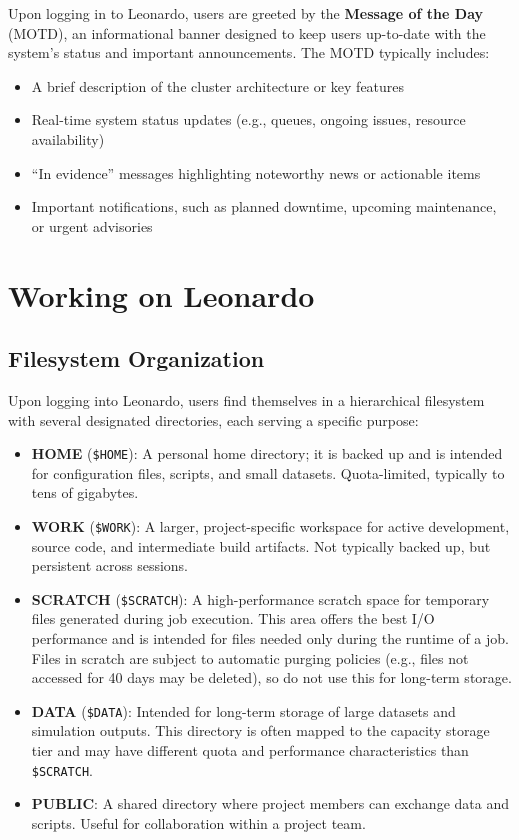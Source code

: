 Upon logging in to Leonardo, users are greeted by the \textbf{Message of the Day} (MOTD), an informational banner designed to keep users up-to-date with the system's status and important announcements. The MOTD typically includes:
\begin{itemize}
    \item A brief description of the cluster architecture or key features
    \item Real-time system status updates (e.g., queues, ongoing issues, resource availability)
    \item ``In evidence'' messages highlighting noteworthy news or actionable items
    \item Important notifications, such as planned downtime, upcoming maintenance, or urgent advisories
\end{itemize}

\section{Working on Leonardo}

\subsection{Filesystem Organization}

Upon logging into Leonardo, users find themselves in a hierarchical filesystem with several designated directories, each serving a specific purpose:

\begin{itemize}
    \item \textbf{HOME} (\texttt{\$HOME}): A personal home directory; it is backed up and is intended for configuration files, scripts, and small datasets. Quota-limited, typically to tens of gigabytes.
    
    \item \textbf{WORK} (\texttt{\$WORK}): A larger, project-specific workspace for active development, source code, and intermediate build artifacts. Not typically backed up, but persistent across sessions.
    
    \item \textbf{SCRATCH} (\texttt{\$SCRATCH}): A high-performance scratch space for temporary files generated during job execution. This area offers the best I/O performance and is intended for files needed only during the runtime of a job. Files in scratch are subject to automatic purging policies (e.g., files not accessed for 40 days may be deleted), so do not use this for long-term storage.
    
    \item \textbf{DATA} (\texttt{\$DATA}): Intended for long-term storage of large datasets and simulation outputs. This directory is often mapped to the capacity storage tier and may have different quota and performance characteristics than \texttt{\$SCRATCH}.
    
    \item \textbf{PUBLIC}: A shared directory where project members can exchange data and scripts. Useful for collaboration within a project team.
\end{itemize}

